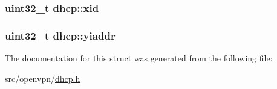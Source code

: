 \subsubsection[{xid}]{\setlength{\rightskip}{0pt plus 5cm}uint32\+\_\+t dhcp\+::xid}\label{structdhcp_ae746102c3b1356e9fbf48b6b9eef51da}
\hypertarget{structdhcp_a1d7df83a89311561fa6de62d0b67dd1e}{}
\subsubsection[{yiaddr}]{\setlength{\rightskip}{0pt plus 5cm}uint32\+\_\+t dhcp\+::yiaddr}\label{structdhcp_a1d7df83a89311561fa6de62d0b67dd1e}


The documentation for this struct was generated from the following file\+:\begin{DoxyCompactItemize}
\item 
src/openvpn/\hyperlink{dhcp_8h}{dhcp.\+h}\end{DoxyCompactItemize}
